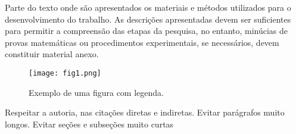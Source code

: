 Parte do texto onde são apresentados os materiais e métodos utilizados para o desenvolvimento do trabalho. As descrições apresentadas devem ser suficientes para permitir a compreensão das etapas da pesquisa, no entanto, minúcias de provas matemáticas ou procedimentos experimentais, se necessários, devem constituir material anexo.

\begin{figure}[htbp]
\centerline{\texttt{[image: fig1.png]}}
\caption{Exemplo de uma figura com legenda.}
\label{fig}
\end{figure}

Respeitar a autoria, nas citações diretas e indiretas. Evitar parágrafos muito longos. Evitar seções e subseções muito curtas